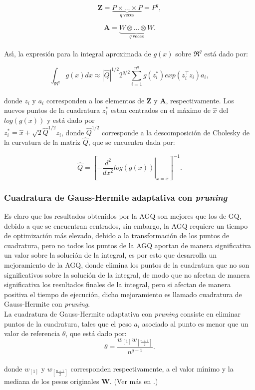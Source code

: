 \[
\textbf{Z}=\underbrace{P \times \ldots \times P}_{q\ \text{veces}}=P^q,
\]

\[
\textbf{A}=\underbrace{W \otimes \ldots \otimes W}_{q\ \text{veces}}.
\]
\\
As\'{\i}, la expresi\'{o}n para la integral aproximada de $g(x)$ sobre $\Re^q$ est\'{a} dado por:

\[
\int_{\Re^q}{g(x)dx}\approx|\hat{Q}|^{1/2} 2^{q/2}\sum_{i=1}^{n^q}g(z_i^*)exp(z_i^{\top}z_i)a_i,
\]
\\
donde $z_i$ y $a_i$ corresponden a los elementos de $\textbf{Z}$ y $\textbf{A}$, respectivamente. Los nuevos puntos de la cuadratura $z_i^*$ estan centrados en el m\'{a}ximo de $\hat{x}$ del $log(g(x))$ y est\'{a} dado por \\
$z_i^*=\hat{x}+\sqrt{2}\hat{Q}^{1/2}z_i$, donde $\hat{Q}^{1/2}$ corresponde a la descomposici\'{o}n de Cholesky de la curvatura de la matriz $\hat{Q}$, que se encuentra dada por:

\[
\hat{Q}={\left[\left. -\frac{d^2}{dx^2}log(g(x))\right|_{x=\hat{x}}\right]^{-1}}.
\]

\subsubsection{Cuadratura de Gauss-Hermite adaptativa con \textit{pruning}}

Es claro que los resultados obtenidos por la AGQ son mejores que los de GQ, debido a que se encuentran centrados, sin embargo, la AGQ requiere un tiempo de optimizaci\'{o}n m\'{a}s elevado, debido a la transformaci\'{o}n de los puntos de cuadratura, pero no todos los puntos de la AGQ aportan de manera significativa un valor sobre la soluci\'{o}n de la integral, es por esto que \cite{Hernandez1} desarrolla un mejoramiento de la AGQ, donde elimina los puntos de la cuadratura que no son significativos sobre la soluci\'{o}n de la integral, de modo que no afectan de manera significativa los resultados finales de la integral, pero si afectan de manera positiva el tiempo de ejecuci\'{o}n, dicho mejoramiento es llamado cuadratura de Gauss-Hermite con \textit{pruning}.\\

La cuadratura de Gauss-Hermite adaptativa con \textit{pruning} consiste en eliminar puntos de la cuadratura, tales que el peso $a_i$ asociado al punto es menor que un valor de referencia $\theta$, que est\'{a} dado por:
\[
\theta=\frac{w_{[1]}w_{[\frac{n+1}{2}]}}{n^{q-1}}.
\]
\\
donde $w_{[1]}$ y $w_{[\frac{n+1}{2}]}$ corresponden respectivamente, a el valor m\'{\i}nimo y la mediana de los pesos originales \textbf{W}. (Ver m\'{a}s en \cite{Hernandez1}.)


